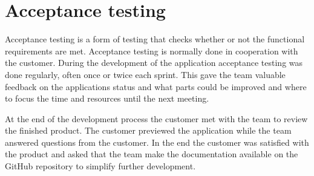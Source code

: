 \section{Acceptance testing}
Acceptance testing is a form of testing that checks whether or not the functional requirements are met. Acceptance testing is normally done in cooperation with the customer. During the development of the application acceptance testing was done regularly, often once or twice each sprint. This gave the team valuable feedback on the applications status and what parts could be improved and where to focus the time and resources until the next meeting.

At the end of the development process the customer met with the team to review the finished product. The customer previewed the application while the team answered questions from the customer. In the end the customer was satisfied with the product and asked that the team make the documentation available on the GitHub repository to simplify further development.